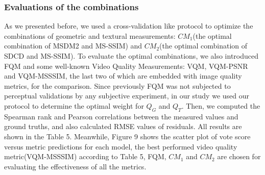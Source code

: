 \subsubsection{Evaluations of the combinations}
As we presented before, we used a cross-validation like protocol to optimize the combinations of geometric and textural measurements: $CM_1$(the optimal combination of MSDM2 and MS-SSIM) and $CM_2$(the optimal combination of SDCD and MS-SSIM). To evaluate the optimal combinations, we also introduced FQM and some well-known Video Quality Measurements: VQM, VQM-PSNR and VQM-MSSSIM, the last two of which are embedded with image quality metrics, for the comparison. Since previously FQM was not subjected to perceptual validations by any subjective experiment, in our study we used our protocol to determine the optimal weight for $Q_G$ and $Q_T$. Then, we computed the Spearman rank and Pearson correlations between the measured values and ground truths, and also calculated RMSE values of residuals. All results are shown in the Table 5. Meanwhile, Figure 9 shows the scatter plot of vote score versus metric predictions for each model, the best performed video quality metric(VQM-MSSSIM) according to Table 5, FQM, $CM_1$ and $CM_2$ are chosen for evaluating the effectiveness of all the metrics.\\
